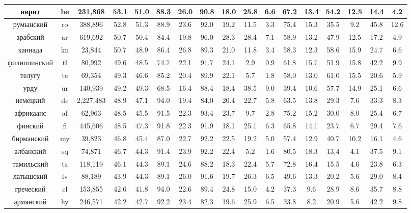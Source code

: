 \begin{table*}
{\begin{tabular}{|c|c|c||c|c|c|c|c|c|c|c|c|c|c|c|c|c|}
иврит & he & 231,868 & 53.1 & 51.0 & 88.3 & 26.0 & 90.8 & 18.0 & 25.8 & 6.6 & 67.2 & 13.4 & 54.2 & 12.5 & 14.4 & 4.2\\ \hline
румынский & ro & 388,896 & 52.8 & 51.3 & 88.9 & 23.6 & 92.0 & 19.2 & 11.5 & 3.3 & 75.4 & 15.3 & 35.5 & 9.2 & 45.8 & 12.6\\ \hline
арабский & ar & 619,692 & 50.7 & 50.4 & 84.4 & 19.8 & 96.0 & 28.3 & 28.4 & 7.1 & 58.9 & 13.2 & 47.9 & 12.5 & 17.2 & 4.9\\ \hline
каннада & kn & 23,844 & 50.7 & 48.9 & 86.4 & 26.8 & 89.3 & 21.0 & 11.8 & 3.4 & 58.3 & 12.3 & 58.6 & 15.9 & 24.7 & 6.6\\ \hline
филиппинский & tl & 80,992 & 49.6 & 48.5 & 74.7 & 22.1 & 91.7 & 24.1 & 2.9 & 0.9 & 61.8 & 15.7 & 51.9 & 15.8 & 42.2 & 9.9\\ \hline
телугу & te & 69,354 & 49.3 & 46.6 & 85.2 & 20.4 & 89.9 & 22.1 & 5.7 & 1.8 & 58.0 & 13.0 & 61.0 & 15.5 & 20.6 & 5.9\\ \hline
урду & ur & 140,939 & 49.2 & 49.3 & 68.5 & 16.4 & 88.4 & 18.4 & 38.5 & 9.0 & 39.4 & 10.6 & 57.7 & 14.9 & 25.1 & 6.6\\ \hline
немецкий & de & 2,227,483 & 48.9 & 47.1 & 94.0 & 19.4 & 84.0 & 20.4 & 22.7 & 5.8 & 63.5 & 13.8 & 29.3 & 7.6 & 33.3 & 8.3\\ \hline
африкаанс & af & 62,963 & 48.5 & 45.5 & 91.5 & 22.3 & 93.4 & 23.7 & 9.7 & 2.8 & 75.2 & 15.2 & 30.0 & 8.0 & 25.4 & 6.7\\ \hline
финский & fi & 445,606 & 48.5 & 47.3 & 91.8 & 22.3 & 91.9 & 18.1 & 25.1 & 6.3 & 65.8 & 14.1 & 23.7 & 6.7 & 29.4 & 7.6\\ \hline
бирманский & my & 39,823 & 46.8 & 45.4 & 87.0 & 22.7 & 92.2 & 22.5 & 19.2 & 5.0 & 57.4 & 12.9 & 40.7 & 10.2 & 16.1 & 4.6\\ \hline
албанский & sq & 74,871 & 46.7 & 44.3 & 91.4 & 23.9 & 92.2 & 22.4 & 5.2 & 1.6 & 80.5 & 18.3 & 13.4 & 4.1 & 37.5 & 9.1\\ \hline
тамильский & ta & 118,119 & 46.1 & 44.3 & 89.1 & 24.6 & 88.2 & 18.3 & 22.4 & 5.7 & 72.8 & 16.4 & 15.5 & 4.6 & 23.8 & 6.3\\ \hline
латышский & lv & 88,189 & 43.9 & 44.3 & 89.1 & 26.0 & 91.6 & 19.7 & 26.3 & 6.5 & 49.6 & 13.3 & 20.2 & 5.6 & 29.0 & 8.4\\ \hline
греческий & el & 153,855 & 42.6 & 41.8 & 94.0 & 22.6 & 89.4 & 24.8 & 15.0 & 4.2 & 37.3 & 9.6 & 28.9 & 8.6 & 35.7 & 8.8\\ \hline
армянский & hy & 246,571 & 42.2 & 42.7 & 92.2 & 23.4 & 82.3 & 19.6 & 25.9 & 6.5 & 33.8 & 8.2 & 20.9 & 5.6 & 42.2 & 9.8\\ \hline

\end{tabular}}
\end{table*}
